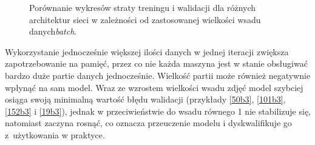 \begin{figure}[H]\ContinuedFloat
\hspace{-1.5cm}
\hfill
\caption{Porównanie wykresów straty treningu i walidacji dla różnych architektur sieci w zależności od zastosowanej wielkości wsadu danych\emph{batch}.}
\label{fig:batch_porównanie}
\end{figure}




\hspace{0.5cm}
Wykorzystanie jednocześnie większej ilości danych w jednej iteracji zwiększa zapotrzebowanie na pamięć, przez co nie każda maszyna jest w stanie obsługiwać bardzo duże partie danych jednocześnie. Wielkość partii może również negatywnie wpłynąć na sam model. Wraz ze wzrostem wielkości wsadu zdjęć model szybciej osiąga swoją minimalną wartość błędu walidacji (przykłady \ref{50b3}, \ref{101b3}, \ref{152b3} i \ref{19b3}), jednak w przeciwieństwie do wsadu równego 1 nie stabilizuje się, natomiast zaczyna rosnąć, co oznacza przeuczenie modelu i dyskwalifikuje go z~użytkowania w praktyce.

